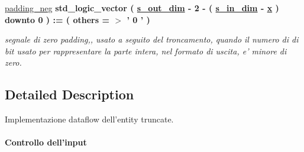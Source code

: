 \begin{DoxyCompactItemize}
\hyperlink{group___truncate_ga130836df2917c4b75d1fc24500082e76}{padding\+\_\+neg} {\bfseries \textcolor{vhdlchar}{std\+\_\+logic\+\_\+vector}\textcolor{vhdlchar}{ }\textcolor{vhdlchar}{(}\textcolor{vhdlchar}{ }\textcolor{vhdlchar}{ }\textcolor{vhdlchar}{ }\textcolor{vhdlchar}{ }{\bfseries \hyperlink{group___truncate_ga8b62f8bfecb0fab845995b8b051101bc}{s\+\_\+out\+\_\+dim}} \textcolor{vhdlchar}{-\/}\textcolor{vhdlchar}{ } \textcolor{vhdldigit}{2} \textcolor{vhdlchar}{-\/}\textcolor{vhdlchar}{ }\textcolor{vhdlchar}{(}\textcolor{vhdlchar}{ }\textcolor{vhdlchar}{ }\textcolor{vhdlchar}{ }\textcolor{vhdlchar}{ }{\bfseries \hyperlink{group___truncate_gad3d18243ad6fe53a2277e2aa9b94ca45}{s\+\_\+in\+\_\+dim}} \textcolor{vhdlchar}{-\/}\textcolor{vhdlchar}{ }\textcolor{vhdlchar}{ }\textcolor{vhdlchar}{ }{\bfseries \hyperlink{group___truncate_ga63701d8af27da7452a7588efcff357bc}{x}} \textcolor{vhdlchar}{ }\textcolor{vhdlchar}{)}\textcolor{vhdlchar}{ }\textcolor{vhdlchar}{ }\textcolor{vhdlchar}{downto}\textcolor{vhdlchar}{ }\textcolor{vhdlchar}{ } \textcolor{vhdldigit}{0} \textcolor{vhdlchar}{ }\textcolor{vhdlchar}{)}\textcolor{vhdlchar}{ }\textcolor{vhdlchar}{ }\textcolor{vhdlchar}{ }\textcolor{vhdlchar}{\+:}\textcolor{vhdlchar}{=}\textcolor{vhdlchar}{ }\textcolor{vhdlchar}{(}\textcolor{vhdlchar}{ }\textcolor{vhdlchar}{ }\textcolor{vhdlchar}{others}\textcolor{vhdlchar}{ }\textcolor{vhdlchar}{ }\textcolor{vhdlchar}{=}\textcolor{vhdlchar}{ }\textcolor{vhdlchar}{$>$}\textcolor{vhdlchar}{ }\textcolor{vhdlchar}{'}\textcolor{vhdlchar}{ } \textcolor{vhdldigit}{0} \textcolor{vhdlchar}{ }\textcolor{vhdlchar}{'}\textcolor{vhdlchar}{ }\textcolor{vhdlchar}{)}\textcolor{vhdlchar}{ }} 
\begin{DoxyCompactList}\small\item\em segnale di zero padding,, usato a seguito del troncamento, quando il numero di di bit usato per rappresentare la parte intera, nel formato di uscita, e' minore di zero. \end{DoxyCompactList}\end{DoxyCompactItemize}


\subsection{Detailed Description}
Implementazione dataflow dell'entity truncate. 

\paragraph*{Controllo dell'input}

